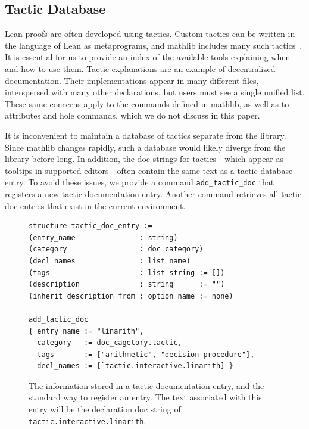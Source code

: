 \documentclass[runningheads]{llncs}
\newcommand{\mathlib}{\textsf{mathlib}\xspace}
\newcommand{\lean}[1]{\lstinline[language=lean]{#1}}
\begin{document}
\subsection{Tactic Database}
\label{subsection:tacdb}

Lean proofs are often developed using tactics.
Custom tactics can be written in the language of Lean as metaprograms,
and \mathlib includes many such tactics~\cite[Sect.\ 6]{mathlib20}.
It is essential for us to provide an index of the available tools
explaining when and how to use them.
Tactic explanations are an example of decentralized documentation.
Their implementations appear in many different files,
interspersed with many other declarations,
but users must see a single unified list.
These same concerns apply to the commands defined in \mathlib,
as well as to attributes and hole commands,
which we do not discuss in this paper.

It is inconvenient to maintain a database of tactics separate from the library.
Since \mathlib changes rapidly,
such a database would likely diverge from the library before long.
In addition,
the doc strings for tactics---which appear as tooltips in supported editors---often
contain the same text as a tactic database entry.
To avoid these issues,
we provide a command \lean{add_tactic_doc}
that registers a new tactic documentation entry.
Another command retrieves all tactic doc entries
that exist in the current environment.

\begin{figure}[t]
\begin{lstlisting}
structure tactic_doc_entry :=
(entry_name               : string)
(category                 : doc_category)
(decl_names               : list name)
(tags                     : list string := [])
(description              : string      := "")
(inherit_description_from : option name := none)

add_tactic_doc
{ entry_name := "linarith",
  category   := doc_cagetory.tactic,
  tags       := ["arithmetic", "decision procedure"],
  decl_names := [`tactic.interactive.linarith] }
\end{lstlisting}

\caption{The information stored in a tactic documentation entry,
and the standard way to register an entry.
The text associated with this entry will be the declaration doc string of \lean{tactic.interactive.linarith}.}
\label{figure:tacdoc}
\end{figure}
\end{document}
